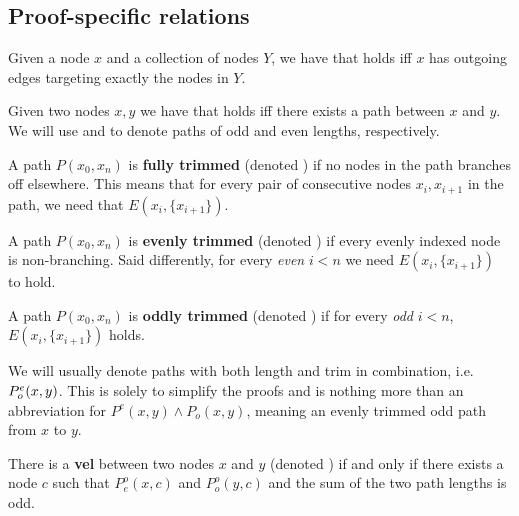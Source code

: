 \subsection{Proof-specific relations}
\label{sub:Proof-specific relations}
\begin{definition}
  Given a node $x$ and a collection of nodes $Y$, we have that  holds iff $x$ has outgoing edges targeting exactly the nodes in $Y$.
\end{definition}
\begin{definition}
  Given two nodes $x,y$ we have that  holds iff there exists a path between $x$ and $y$.
  We will use  and  to denote paths of odd and even lengths, respectively.
\end{definition}
\begin{definition}
  A path $P(x_0,x_n)$ is \textbf{fully trimmed} (denoted ) if no nodes in the path branches off elsewhere.
  This means that for every pair of consecutive nodes $x_i,x_{i+1}$ in the path, we need that $E(x_i,\{ x_{i+1} \})$.
\end{definition}
\begin{definition}
  A path $P(x_0,x_n)$ is \textbf{evenly trimmed} (denoted ) if every evenly indexed node is non-branching.
  Said differently, for every \textit{even} $i < n$ we need $E(x_i,\{x_{i+1}\})$ to hold.
\end{definition}
\begin{definition}
  A path $P(x_0,x_n)$ is \textbf{oddly trimmed} (denoted ) if for every \textit{odd} $i < n$, $E(x_i,\{x_{i+1}\})$ holds.
\end{definition}
We will usually denote paths with both length and trim in combination, i.e. $P^e_o(x,y)$.
This is solely to simplify the proofs and is nothing more than an abbreviation for $P^e(x,y) \wedge P_o(x,y)$, meaning an evenly trimmed odd path from $x$ to $y$.
\begin{definition}
  There is a \textbf{vel} between two nodes $x$ and $y$ (denoted ) if and only if there exists a node $c$ such that $P^o_e(x,c)$ and $P^o_o(y,c)$ and the sum of the two path lengths is odd.
\end{definition}
